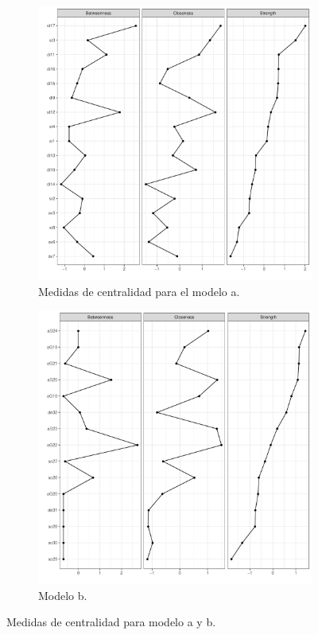 \documentclass[11pt,spanish]{article}\usepackage[]{graphicx}\usepackage[]{color}
\begin{document}
\begin{figure}[ht!]
\centering
\begin{subfigure}{0.6\textwidth}
    \includegraphics[width=\textwidth]{images/centrality_net_pcl5.pdf}
    \caption{Medidas de centralidad para el modelo a.}
    \label{fig:centrapcl5}
\end{subfigure}
\vfill
\begin{subfigure}{0.6\textwidth}
    \includegraphics[width=\textwidth]{images/centrality_net_dean.pdf}
    \caption{Modelo b.}
    \label{fig:centradean}
\end{subfigure}
\caption{Medidas de centralidad para modelo a y b.}
\label{fig:centra_ab}
\end{figure}
\end{document}
